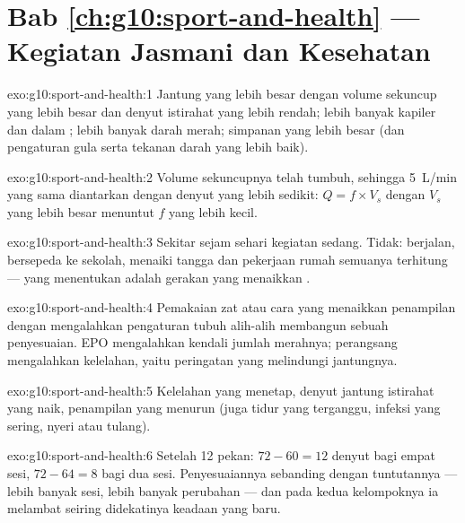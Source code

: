 \section*{Bab \ref{ch:g10:sport-and-health} --- Kegiatan Jasmani dan Kesehatan}

\begin{solution}{exo:g10:sport-and-health:1}
Jantung yang lebih besar dengan volume sekuncup yang lebih besar dan
denyut istirahat yang lebih rendah; lebih banyak kapiler dan
 dalam ; lebih banyak  darah merah; simpanan
 yang lebih besar (dan pengaturan gula serta tekanan darah yang
lebih baik).
\end{solution}

\begin{solution}{exo:g10:sport-and-health:2}
Volume sekuncupnya telah tumbuh, sehingga \qty{5}{L/min} yang sama
diantarkan dengan denyut yang lebih sedikit: $Q = f \times V_s$ dengan
$V_s$ yang lebih besar menuntut $f$ yang lebih kecil.
\end{solution}

\begin{solution}{exo:g10:sport-and-health:3}
Sekitar sejam sehari kegiatan sedang. Tidak: berjalan, bersepeda ke
sekolah, menaiki tangga dan pekerjaan rumah semuanya terhitung --- yang
menentukan adalah gerakan yang menaikkan .
\end{solution}

\begin{solution}{exo:g10:sport-and-health:4}
Pemakaian zat atau cara yang menaikkan penampilan dengan mengalahkan
pengaturan tubuh alih-alih membangun sebuah penyesuaian. EPO
mengalahkan kendali jumlah  merahnya; perangsang mengalahkan
kelelahan, yaitu peringatan yang melindungi jantungnya.
\end{solution}

\begin{solution}{exo:g10:sport-and-health:5}
Kelelahan yang menetap, denyut jantung istirahat yang naik, penampilan
yang menurun (juga tidur yang terganggu, infeksi yang sering, nyeri
 atau tulang).
\end{solution}

\begin{solution}{exo:g10:sport-and-health:6}
Setelah 12 pekan: $72 - 60 = 12$ denyut bagi empat sesi, $72 - 64 = 8$
bagi dua sesi. Penyesuaiannya sebanding dengan tuntutannya --- lebih
banyak sesi, lebih banyak perubahan --- dan pada kedua kelompoknya ia
melambat seiring didekatinya keadaan yang baru.
\end{solution}

